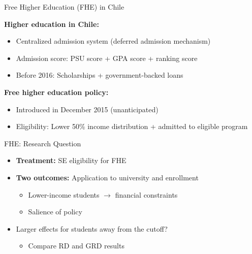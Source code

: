 \documentclass[usenames,dvipsnames,11pt,aspectratio=169]{beamer}
\begin{document}
\begin{frame}{Free Higher Education (FHE) in Chile}

\textbf{Higher education in Chile:}
\begin{itemize}
\item Centralized admission system (deferred admission mechanism)
\item Admission score: PSU score + GPA score + ranking score
\item Before 2016: Scholarships + government-backed loans
\end{itemize}

\textbf{Free higher education policy:}
\begin{itemize}
\item Introduced in December 2015 (unanticipated)
\item Eligibility: Lower 50\% income distribution + admitted to eligible program
\end{itemize}
\end{frame}

\begin{frame}{FHE: Research Question}

\begin{itemize}
\item \textbf{Treatment:} SE eligibility for FHE
   \vspace{0.2cm}
    \item \textbf{Two outcomes:} Application to university and enrollment
    \begin{itemize}
    \item Lower-income students $\rightarrow$ financial constraints
    \item Salience of policy
    \end{itemize}
    \vspace{0.2cm}
    \item Larger effects for students away from the cutoff?
    \begin{itemize}
        \item Compare RD and GRD results
    \end{itemize}
\end{itemize}

\end{frame}
\end{document}
